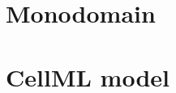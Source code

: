 \documentclass[
10pt, %
a4paper, %
oneside, %
headinclude,footinclude, %
BCOR5mm, %
]{scrartcl}
\begin{document}
\section{Monodomain}
%
%
%
%
\clearpage
%
\section{CellML model}
%
%
%
%
%
\clearpage
%


\end{document}
